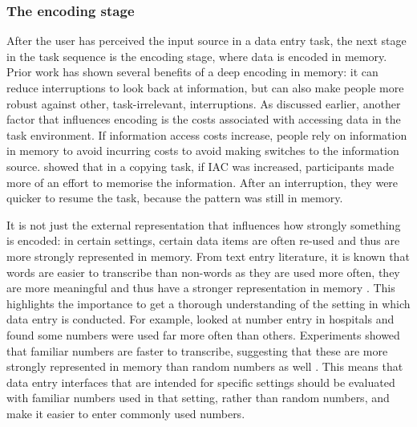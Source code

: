 
\subsubsection{The encoding stage}\label{sec:Encoding_stage}
After the user has perceived the input source in a data entry task, the next stage in the task sequence is the encoding stage, where data is encoded in memory. Prior work has shown several benefits of a deep encoding in memory: it can reduce interruptions to look back at information, but can also make people more robust against other, task-irrelevant, interruptions. As discussed earlier, another factor that  influences encoding is the costs associated with accessing data in the task environment. If information access costs increase, people rely on information in memory to avoid incurring costs to avoid making switches to the information source. \citet{Morgan2009} showed that in a copying task, if IAC was increased, participants made more of an effort to memorise the information. After an interruption, they were quicker to resume the task, because the pattern was still in memory. 

It is not just the external representation that influences how strongly something is encoded: in certain settings, certain data items are often re-used and thus are more strongly represented in memory. From text entry literature, it is known that words are easier to transcribe than non-words as they are used more often, they are more meaningful and thus have a stronger representation in memory \citep{Salthouse1986}. This highlights the importance to get a thorough understanding of the setting in which data entry is conducted. For example, \citet{Wiseman2013a} looked at number entry in hospitals and found some numbers were used far more often than others. Experiments showed that familiar numbers are faster to transcribe, suggesting that these are more strongly represented in memory than random numbers as well \citep{Wiseman2014} . This means that data entry interfaces that are intended for specific settings should be evaluated with familiar numbers used in that setting, rather than random numbers, and make it easier to enter commonly used numbers. 

